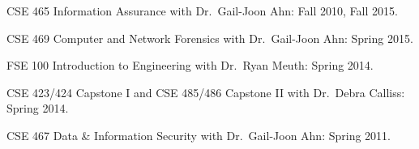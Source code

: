 


\begin{rExperience}

  \item CSE 465 Information Assurance with Dr.\ Gail-Joon Ahn: Fall 2010, Fall 2015.

  \item CSE 469 Computer and Network Forensics with Dr.\ Gail-Joon Ahn: Spring 2015.

  \item FSE 100 Introduction to Engineering with Dr.\ Ryan Meuth: Spring 2014.

  \item CSE 423/424 Capstone I and CSE 485/486 Capstone II with Dr.\ Debra Calliss: Spring 2014.

  \item CSE 467 Data \& Information Security with Dr.\ Gail-Joon Ahn: Spring 2011.

\end{rExperience}
